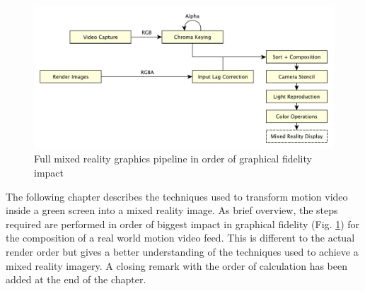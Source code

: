 \begin{figure}[htb]
	\includegraphics[width=\textwidth]{_raw_resources/pipeline_steps/4_0_pipeline.pdf}
	\caption{Full mixed reality graphics pipeline in order of graphical 
	fidelity impact}
	\label{fig:steps:pipeline}
\end{figure}

The following chapter describes the techniques used to transform motion video 
inside a green screen into a mixed reality image. As brief overview, the steps 
required are performed in order of biggest impact in graphical fidelity (Fig. 
\ref{fig:steps:pipeline}) for the composition of a real world motion video 
feed. This is different to the actual render order but gives a better 
understanding of the techniques used to achieve a mixed reality imagery. A 
closing remark with the order of calculation has been added at the end of the 
chapter. 

